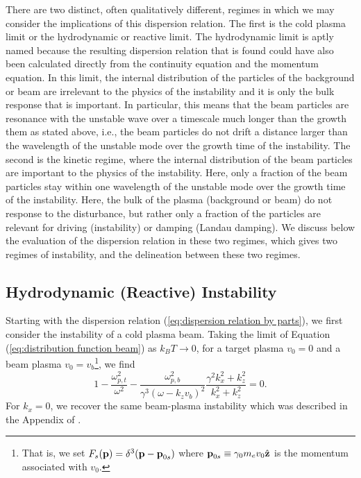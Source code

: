 \documentclass[usenatbib,iop,apj,numberedappendix]{aeb_emulateapj_2015}
\newcommand\bmath[1] {\mbox{\boldmath$\rm #1$}}
\begin{document}
There are two distinct, often qualitatively different, regimes in which we may consider the implications of this dispersion relation.  The first is the cold plasma limit or the hydrodynamic or reactive limit.  The hydrodynamic limit is aptly named because the resulting dispersion relation that is found could have also been calculated directly from the continuity equation and the momentum equation.  In this limit, the internal distribution of the particles of the background or beam are irrelevant to the physics of the instability and it is only the bulk response that is important.  In particular, this means that the beam particles are resonance with the unstable wave over a timescale much longer than the growth them as stated above, i.e., the beam particles do not drift a distance larger than the wavelength of the unstable mode over the growth time of the instability.  The second is the kinetic regime, where the internal distribution of the beam particles are important to the physics of the instability. Here, only a fraction of the beam particles stay within one wavelength of the unstable mode over the growth time of the instability.   Here, the bulk of the plasma (background or beam) do not response to the disturbance, but rather only a fraction of the particles are relevant for driving (instability) or damping (Landau damping).  We discuss below the evaluation of the dispersion relation in these two regimes, which gives two regimes of instability, and the delineation between these two regimes.

\subsection{Hydrodynamic (Reactive) Instability}

Starting with the dispersion relation (\ref{eq:dispersion relation by parts}), we first consider the instability of a cold plasma beam. 
Taking the limit of Equation (\ref{eq:distribution function beam}) as $k_BT  \rightarrow 0$, for a target plasma $v_0=0$ and a beam plasma $v_0=v_b$\footnote{That is, we set $F_s(\bmath{p})=\delta^3(\bmath{p}-\bmath{p}_{0s})$ where $\bmath{p}_{0s}\equiv \gamma_0 m_e v_0 \hat{\bmath{z}}$ is the momentum associated with $v_0$.}, we find
\begin{equation}\label{eq:dispersion relation reactive}
 1 - \frac{\omega_{p,t}^2}{\omega^2} - \frac{\omega_{p,b}^2}{\gamma^3(\omega-k_z v_b)^2}\frac{\gamma^2 k_x^2 + k_z^2}{k_x^2 + k_z^2} = 0.
\end{equation}
For $k_x = 0$, we recover the same beam-plasma instability which was described in the Appendix of \citet{paperI}.  
\end{document}
